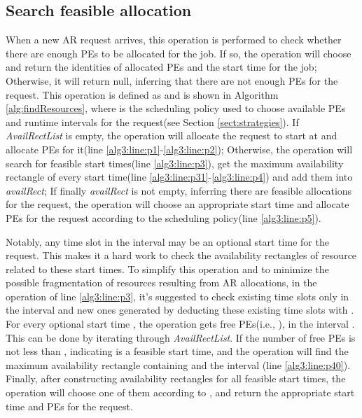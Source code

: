 \documentclass[preprint,12pt]{elsarticle}
\begin{document}
\subsection{Search feasible allocation}
\label{sec:search}
When a new AR request arrives, this operation is performed to check whether there are enough PEs to be allocated for the job. If so, the operation will choose and return the identities of allocated PEs and the start time for the job; Otherwise, it will return null, inferring that there are not enough PEs for the request. This operation is defined as  and is shown in Algorithm \ref{alg:findResources}, where  is the scheduling policy used to choose available PEs and runtime intervals for the request(see Section \ref{sect:strategies}). If \emph{AvailRectList} is empty, the operation will allocate the request to start at  and allocate  PEs for it(line \ref{alg3:line:p1}-\ref{alg3:line:p2}); Otherwise, the operation will search for feasible start times(line \ref{alg3:line:p3}), get the maximum availability rectangle of every start time(line \ref{alg3:line:p31}-\ref{alg3:line:p4}) and add them into \emph{availRect}; If finally \emph{availRect} is not empty, inferring there are feasible allocations for the request, the operation will choose an appropriate start time and allocate PEs for the request according to the scheduling policy(line \ref{alg3:line:p5}).


Notably, any time slot in the interval  may be an optional start time for the request. This makes it a hard work to check the availability rectangles of resource related to these start times. To simplify this operation and to minimize the possible fragmentation of resources resulting from AR allocations, in the operation of line \ref{alg3:line:p3}, it's suggested to check existing time slots only in the interval  and new ones generated by deducting these existing time slots with . For every optional start time , the operation gets free PEs(i.e., ),  in the interval . This can be done by iterating through \emph{AvailRectList}. If the number of free PEs is not less than , indicating  is a feasible start time, and the operation will find the maximum availability rectangle containing  and the interval (line \ref{alg3:line:p40}). Finally, after constructing availability rectangles for all feasible start times, the operation will choose one of them according to , and return the appropriate start time and  PEs for the request.
\end{document}
